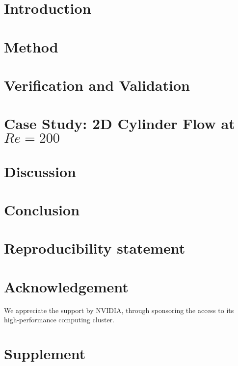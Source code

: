 \documentclass[5p, twocolumn, times, sort&compress]{elsarticle}
\begin{document}
    \section{Introduction}
    

    \section{Method}
    

    \section{Verification and Validation}
    
    

    \section{Case Study: 2D Cylinder Flow at $Re=\num{200}$}\label{sec:case-study}
    

    \section{Discussion}
    

    \section{Conclusion}
    

    \section{Reproducibility statement}
    

    \section*{Acknowledgement}
    We appreciate the support by NVIDIA, through sponsoring the access to its high-performance computing cluster.

    

  
    \appendix
    \section{Supplement}
    
\end{document}
